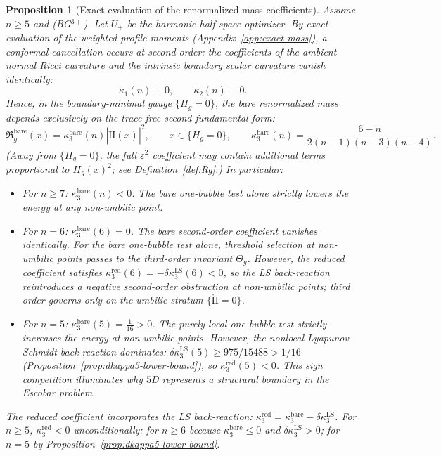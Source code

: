 \documentclass[11pt,reqno,a4paper]{amsart}
\numberwithin{equation}{section}
\theoremstyle{plain}
\newtheorem{proposition}[theorem]{Proposition}
\theoremstyle{remark}
\theoremstyle{plain}
\begin{document}
\begin{proposition}[Exact evaluation of the renormalized mass coefficients]\label{prop:kappa-explicit}
Assume $n\ge5$ and \textup{(BG$^{3+}$)}. Let $U_+$ be the harmonic half-space optimizer.
By exact evaluation of the weighted profile moments
(Appendix~\ref{app:exact-mass}),
a conformal cancellation occurs at second order:
the coefficients of the ambient normal Ricci curvature and the intrinsic
boundary scalar curvature vanish identically:
\[
\kappa_1(n)\equiv0,\qquad \kappa_2(n)\equiv0.
\]
Hence, in the boundary-minimal gauge $\{H_g=0\}$, the bare renormalized mass depends
\emph{exclusively} on the trace-free second fundamental form:
\begin{equation}\label{eq:kappa3-exact}
\mathfrak R_g^{\mathrm{bare}}(x) = \kappa_3^{\mathrm{bare}}(n) |\mathring{\mathrm{II}}(x)|^2,
\qquad x\in\{H_g=0\},
\qquad
\kappa_3^{\mathrm{bare}}(n) = \frac{6-n}{2(n-1)(n-3)(n-4)}.
\end{equation}
(Away from $\{H_g=0\}$, the full $\varepsilon^2$ coefficient may contain additional terms proportional
to $H_g(x)^2$; see Definition~\ref{def:Rg}.)
In particular:
\begin{itemize}
\item For $n \ge 7$: $\kappa_3^{\mathrm{bare}}(n) < 0$.
The bare one-bubble test alone strictly lowers the energy at any non-umbilic point.
\item For $n = 6$: $\kappa_3^{\mathrm{bare}}(6) = 0$.
The \emph{bare} second-order coefficient vanishes identically.
For the bare one-bubble test alone, threshold selection at non-umbilic
points passes to the third-order invariant $\Theta_g$.
However, the \emph{reduced} coefficient satisfies
$\kappa_3^{\mathrm{red}}(6)=-\delta\kappa_3^{\mathrm{LS}}(6)<0$,
so the LS back-reaction reintroduces a negative second-order obstruction
at non-umbilic points; third order governs only on the umbilic stratum
$\{\mathring{\mathrm{II}}=0\}$.
\item For $n = 5$: $\kappa_3^{\mathrm{bare}}(5) = \frac{1}{16} > 0$.
The purely local one-bubble test strictly \emph{increases} the energy
at non-umbilic points.
However, the nonlocal Lyapunov--Schmidt back-reaction dominates:
$\delta\kappa_3^{\mathrm{LS}}(5) \ge 975/15488 > 1/16$
(Proposition~\ref{prop:dkappa5-lower-bound}),
so $\kappa_3^{\mathrm{red}}(5) < 0$.
This sign competition illuminates why $5$D represents a structural boundary
in the Escobar problem.
\end{itemize}
The \emph{reduced} coefficient incorporates the LS back-reaction:
$\kappa_3^{\mathrm{red}} = \kappa_3^{\mathrm{bare}} - \delta\kappa_3^{\mathrm{LS}}$.
For $n\ge5$, $\kappa_3^{\mathrm{red}} < 0$ unconditionally:
for $n\ge6$ because $\kappa_3^{\mathrm{bare}}\le0$ and $\delta\kappa_3^{\mathrm{LS}}>0$;
for $n=5$ by Proposition~\ref{prop:dkappa5-lower-bound}.
\end{proposition}
\end{document}

